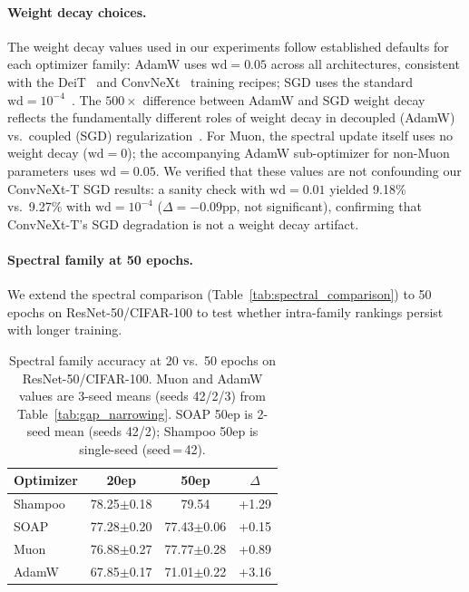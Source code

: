 \paragraph{Weight decay choices.}
The weight decay values used in our experiments follow established defaults for each optimizer family: AdamW uses $\text{wd}=0.05$ across all architectures, consistent with the DeiT~\cite{touvron2021training} and ConvNeXt~\cite{liu2022convnet} training recipes; SGD uses the standard $\text{wd}=10^{-4}$~\cite{he2016deep}. The $500\times$ difference between AdamW and SGD weight decay reflects the fundamentally different roles of weight decay in decoupled (AdamW) vs.\ coupled (SGD) regularization~\cite{loshchilov2019decoupled}. For Muon, the spectral update itself uses no weight decay ($\text{wd}=0$); the accompanying AdamW sub-optimizer for non-Muon parameters uses $\text{wd}=0.05$. We verified that these values are not confounding our ConvNeXt-T SGD results: a sanity check with $\text{wd}=0.01$ yielded 9.18\% vs.\ 9.27\% with $\text{wd}=10^{-4}$ ($\Delta=-0.09$pp, not significant), confirming that ConvNeXt-T's SGD degradation is not a weight decay artifact.

\paragraph{Spectral family at 50 epochs.}
We extend the spectral comparison (Table~\ref{tab:spectral_comparison}) to 50 epochs on ResNet-50/CIFAR-100 to test whether intra-family rankings persist with longer training.

\begin{table}[h]
\centering
\caption{Spectral family accuracy at 20 vs.\ 50 epochs on ResNet-50/CIFAR-100. Muon and AdamW values are 3-seed means (seeds 42/2/3) from Table~\ref{tab:gap_narrowing}. SOAP 50ep is 2-seed mean (seeds 42/2); Shampoo 50ep is single-seed (seed\,=\,42).}
\label{tab:spectral_50ep}
\vspace{-0.5em}
\small
\begin{tabular}{@{}lccc@{}}
\toprule
Optimizer & 20ep & 50ep & $\Delta$ \\
\midrule
Shampoo & 78.25{\scriptsize$\pm$0.18} & 79.54 & +1.29 \\
SOAP    & 77.28{\scriptsize$\pm$0.20} & 77.43{\scriptsize$\pm$0.06} & +0.15 \\
Muon    & 76.88{\scriptsize$\pm$0.27} & 77.77{\scriptsize$\pm$0.28} & +0.89 \\
AdamW   & 67.85{\scriptsize$\pm$0.17} & 71.01{\scriptsize$\pm$0.22} & +3.16 \\
\bottomrule
\end{tabular}
\vspace{-0.5em}
\end{table}


